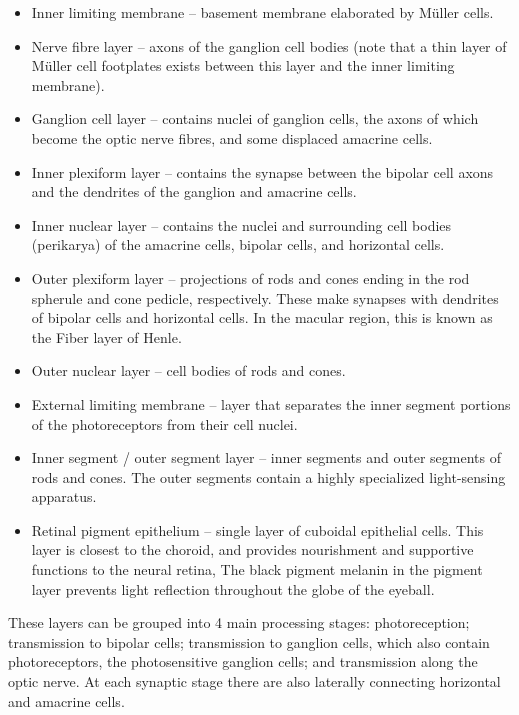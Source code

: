 \begin{itemize}
\tightlist
\item
  Inner limiting membrane -- basement membrane elaborated by Müller cells.
\item
  Nerve fibre layer -- axons of the ganglion cell bodies (note that a thin layer of Müller cell footplates exists between this layer and the inner limiting membrane).
\item
  Ganglion cell layer -- contains nuclei of ganglion cells, the axons of which become the optic nerve fibres, and some displaced amacrine cells.
\item
  Inner plexiform layer -- contains the synapse between the bipolar cell axons and the dendrites of the ganglion and amacrine cells.
\item
  Inner nuclear layer -- contains the nuclei and surrounding cell bodies (perikarya) of the amacrine cells, bipolar cells, and horizontal cells.
\item
  Outer plexiform layer -- projections of rods and cones ending in the rod spherule and cone pedicle, respectively. These make synapses with dendrites of bipolar cells and horizontal cells. In the macular region, this is known as the Fiber layer of Henle.
\item
  Outer nuclear layer -- cell bodies of rods and cones.
\item
  External limiting membrane -- layer that separates the inner segment portions of the photoreceptors from their cell nuclei.
\item
  Inner segment / outer segment layer -- inner segments and outer segments of rods and cones. The outer segments contain a highly specialized light-sensing apparatus.
\item
  Retinal pigment epithelium -- single layer of cuboidal epithelial cells. This layer is closest to the choroid, and provides nourishment and supportive functions to the neural retina, The black pigment melanin in the pigment layer prevents light reflection throughout the globe of the eyeball.
\end{itemize}

These layers can be grouped into 4 main processing stages: photoreception; transmission to bipolar cells; transmission to ganglion cells, which also contain photoreceptors, the photosensitive ganglion cells; and transmission along the optic nerve. At each synaptic stage there are also laterally connecting horizontal and amacrine cells.



